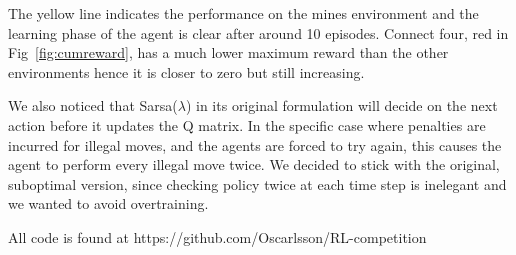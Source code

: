 The yellow line indicates the performance on the mines environment and the learning phase of the agent is clear after around 10 episodes. Connect four, red in Fig~\ref{fig:cumreward}, has a much lower maximum reward than the other environments hence it is closer to zero but still increasing.

We also noticed that Sarsa($\lambda$) in its original formulation will decide on the next action before it updates the Q matrix. In the specific case where penalties are incurred for illegal moves, and the agents are forced to try again, this causes the agent to perform every illegal move twice. We decided to stick with the original, suboptimal version, since checking policy twice at each time step is inelegant and we wanted to avoid overtraining.

All code is found at https://github.com/Oscarlsson/RL-competition
